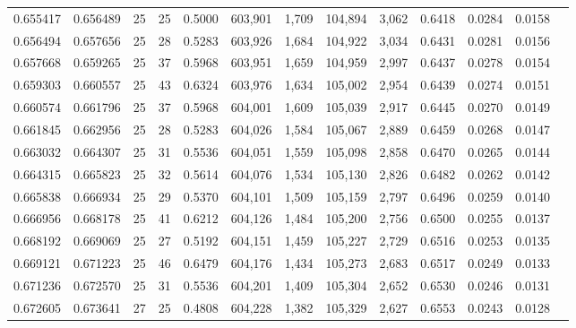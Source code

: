 \begin{tabular}{rrrrrrrrrrrrr}
0.655417 & 0.656489 &    25 &  25 &                                     0.5000 & 603,901 &   1,709 & 104,894 &   3,062 & 0.6418 & 0.0284 & 0.0158 \\
0.656494 & 0.657656 &    25 &  28 &                                     0.5283 & 603,926 &   1,684 & 104,922 &   3,034 & 0.6431 & 0.0281 & 0.0156 \\
0.657668 & 0.659265 &    25 &  37 &                                     0.5968 & 603,951 &   1,659 & 104,959 &   2,997 & 0.6437 & 0.0278 & 0.0154 \\
0.659303 & 0.660557 &    25 &  43 &                                     0.6324 & 603,976 &   1,634 & 105,002 &   2,954 & 0.6439 & 0.0274 & 0.0151 \\
0.660574 & 0.661796 &    25 &  37 &                                     0.5968 & 604,001 &   1,609 & 105,039 &   2,917 & 0.6445 & 0.0270 & 0.0149 \\
0.661845 & 0.662956 &    25 &  28 &                                     0.5283 & 604,026 &   1,584 & 105,067 &   2,889 & 0.6459 & 0.0268 & 0.0147 \\
0.663032 & 0.664307 &    25 &  31 &                                     0.5536 & 604,051 &   1,559 & 105,098 &   2,858 & 0.6470 & 0.0265 & 0.0144 \\
0.664315 & 0.665823 &    25 &  32 &                                     0.5614 & 604,076 &   1,534 & 105,130 &   2,826 & 0.6482 & 0.0262 & 0.0142 \\
0.665838 & 0.666934 &    25 &  29 &                                     0.5370 & 604,101 &   1,509 & 105,159 &   2,797 & 0.6496 & 0.0259 & 0.0140 \\
0.666956 & 0.668178 &    25 &  41 &                                     0.6212 & 604,126 &   1,484 & 105,200 &   2,756 & 0.6500 & 0.0255 & 0.0137 \\
0.668192 & 0.669069 &    25 &  27 &                                     0.5192 & 604,151 &   1,459 & 105,227 &   2,729 & 0.6516 & 0.0253 & 0.0135 \\
0.669121 & 0.671223 &    25 &  46 &                                     0.6479 & 604,176 &   1,434 & 105,273 &   2,683 & 0.6517 & 0.0249 & 0.0133 \\
0.671236 & 0.672570 &    25 &  31 &                                     0.5536 & 604,201 &   1,409 & 105,304 &   2,652 & 0.6530 & 0.0246 & 0.0131 \\
0.672605 & 0.673641 &    27 &  25 &                                     0.4808 & 604,228 &   1,382 & 105,329 &   2,627 & 0.6553 & 0.0243 & 0.0128 \\

\end{tabular}
